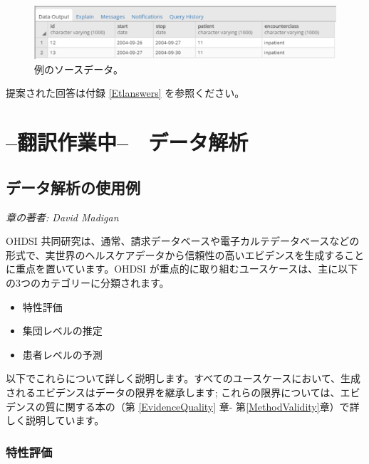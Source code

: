 \documentclass[
  11pt]{book}
\providecommand{\tightlist}{%
  \setlength{\itemsep}{0pt}\setlength{\parskip}{0pt}}
\theoremstyle{definition}
\theoremstyle{definition}
\theoremstyle{definition}
\theoremstyle{definition}
\theoremstyle{remark}
\begin{document}
\begin{figure}

{\centering \includegraphics[width=1\linewidth]{images/ExtractTransformLoad/exerciseSourceData} 

}

\caption{例のソースデータ。}\label{fig:exerciseSourceData}
\end{figure}

提案された回答は付録 \ref{Etlanswers} を参照ください。

\part{--翻訳作業中--　データ解析}\label{part-ux7ffbux8a33ux4f5cux696dux4e2d-ux30c7ux30fcux30bfux89e3ux6790}

\chapter{データ解析の使用例}\label{DataAnalyticsUseCases}

\emph{章の著者: David Madigan}

OHDSI 共同研究は、通常、請求データベースや電子カルテデータベースなどの形式で、実世界のヘルスケアデータから信頼性の高いエビデンスを生成することに重点を置いています。OHDSI が重点的に取り組むユースケースは、主に以下の3つのカテゴリーに分類されます。

\begin{itemize}
\tightlist
\item
  特性評価
\item
  集団レベルの推定
\item
  患者レベルの予測
\end{itemize}

以下でこれらについて詳しく説明します。すべてのユースケースにおいて、生成されるエビデンスはデータの限界を継承します; これらの限界については、エビデンスの質に関する本の（第 \ref{EvidenceQuality} 章- 第\ref{MethodValidity}章）で詳しく説明しています。

\section{特性評価}\label{ux7279ux6027ux8a55ux4fa1}
\end{document}

